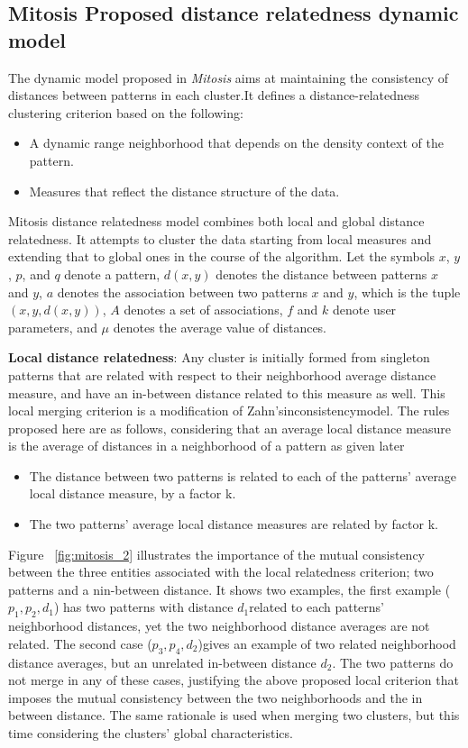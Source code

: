 \subsection{Mitosis Proposed distance relatedness dynamic model}\label{sec:mitosis_proposed}
The dynamic model proposed in \textit{Mitosis} aims at maintaining the consistency of distances between patterns in each cluster.It defines a
distance-relatedness clustering criterion based on the following:
\begin{itemize}
\item A dynamic range neighborhood that depends on the density context of the pattern.
\item Measures that reflect the distance structure of the data.
\end{itemize}

Mitosis distance relatedness model combines both local and global distance relatedness. 
It attempts to cluster the data starting from local measures and extending that to global ones in the course of the algorithm. 
Let the symbols $x$, $y$, $p$, and $q$ denote a pattern, $d(x,y)$ denotes the distance between patterns $x$ and $y$, $a$ denotes the association between two patterns $x$ and $y$, which is the tuple $(x,y,d(x,y))$, $A$ denotes a set of associations, $f$ and $k$ denote user parameters, and $\mu$ denotes the average value of distances.

\textbf{Local distance relatedness}: Any cluster is initially formed from singleton patterns that are related with respect to their neighborhood
average distance measure, and have an in-between distance related to this measure as well. This local merging criterion is a modification of Zahn'sinconsistencymodel.
The rules proposed here are as follows, considering that an average local distance measure is the average of distances in a neighborhood of a pattern as given later
\begin{itemize}
\item The distance between two patterns is related to each of the patterns' average local distance measure, by a factor k.
\item The two patterns' average local distance measures are related by factor k.
\end{itemize}

Figure ~\ref{fig:mitosis_2} illustrates the importance of the mutual consistency between the three entities associated with the local relatedness
criterion; two patterns and a nin-between distance. It shows two examples, the first example ($p_1, p_2, d_1$) has two patterns with distance $d_1$related to each patterns' neighborhood distances, yet the two neighborhood distance averages are not related. The second case ($p_3, p_4, d_2$)gives an example of two related neighborhood distance averages, but an unrelated in-between distance $d_2$. The two patterns do not merge in any of these cases, justifying the above proposed local criterion that imposes the mutual consistency between the two neighborhoods and the in between distance. 
The same rationale is used when merging two clusters, but this time considering the clusters' global characteristics.

